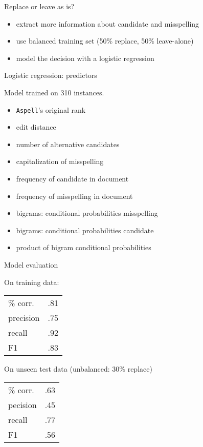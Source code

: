 \begin{frame}{Replace or leave as is?}

\begin{itemize}
\item extract more information about candidate and misspelling
\item use balanced training set (50\% replace, 50\% leave-alone)
\item model the decision with a logistic regression
\end{itemize}

\end{frame}




\begin{frame}{Logistic regression: predictors}

Model trained on 310 instances.

  \begin{itemize}
  \item \alert<2->{\texttt{Aspell}'s original rank}
  \item \alert<2->{edit distance}
  \item number of alternative candidates
  \item \alert<2->{capitalization of misspelling}
  \item frequency of candidate in document
  \item \alert<2->{frequency of misspelling in document}
  \item bigrams: conditional probabilities misspelling
  \item bigrams: conditional probabilities candidate
  \item product of bigram conditional probabilities
  \end{itemize}

\end{frame}


\begin{frame}{Model evaluation}

On training data:\\[1ex]

  \begin{tabular}{lr}
   \% corr. & .81 \\
   precision & .75\\
   recall & .92 \\
   F1  & .83
  \end{tabular}

\pause
\vspace{1cm}


On unseen test data (unbalanced: 30\% replace)\\[1ex]

\begin{tabular}{lr}
\% corr. & .63\\
pecision & .45\\
recall   & .77\\
F1       & .56
\end{tabular}

\end{frame}



